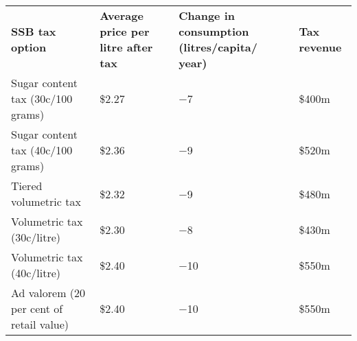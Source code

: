 \bgroup
\def\arraystretch{1.5}
\begin{tabularx}{\columnwidth}{p{2.5cm} *3{>{\centering\arraybackslash}X}}
\toprule
\textbf{SSB tax option} & \textbf{Average price per litre after tax} & \textbf{Change in consumption (litres/capita/ year)} & \textbf{Tax revenue} \\ \cmidrule(lr){1-4}
Sugar content tax (30c/100 grams) & \$2.27 & $-$7 & \$400m \\
Sugar content tax (40c/100 grams) & \$2.36 & $-$9 & \$520m \\
Tiered volumetric tax & \$2.32 & $-$9 & \$480m \\
Volumetric tax (30c/litre) & \$2.30 & $-$8 & \$430m \\
Volumetric tax (40c/litre) & \$2.40 & $-$10 & \$550m \\
Ad valorem (20 per cent of retail value) & \$2.40 & $-$10 & \$550m \\
\bottomrule
\end{tabularx}
\egroup